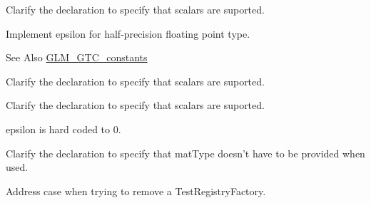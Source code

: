 
\begin{DoxyRefList}
\item[\label{todo__todo000002}%
\hypertarget{todo__todo000002}{}%
Member \hyperlink{group__core__func__integer_gaf5ecf64cbcb7f806a3c7915dd622209b}{glm\-:\-:bit\-Count} (gen\-I\-U\-Type$<$ T $>$ const \&Value)]Clarify the declaration to specify that scalars are suported.  
\item[\label{todo__todo000008}%
\hypertarget{todo__todo000008}{}%
Member \hyperlink{group__gtc__constants_gacb41049b8d22c8aa90e362b96c524feb}{glm\-:\-:epsilon} ()]Implement epsilon for half-\/precision floating point type. \begin{DoxySeeAlso}{See Also}
\hyperlink{group__gtc__constants}{G\-L\-M\-\_\-\-G\-T\-C\-\_\-constants}  
\end{DoxySeeAlso}

\item[\label{todo__todo000003}%
\hypertarget{todo__todo000003}{}%
Member \hyperlink{group__core__func__integer_ga43d5d9ec05ba4c46035c764ad5fd3135}{glm\-:\-:find\-L\-S\-B} (gen\-I\-U\-Type$<$ T $>$ const \&Value)]Clarify the declaration to specify that scalars are suported.  
\item[\label{todo__todo000004}%
\hypertarget{todo__todo000004}{}%
Member \hyperlink{group__core__func__integer_gaee931af2eaecf61b629b33899c9d6f29}{glm\-:\-:find\-M\-S\-B} (gen\-I\-U\-Type$<$ T $>$ const \&Value)]Clarify the declaration to specify that scalars are suported.  
\item[\label{todo__todo000009}%
\hypertarget{todo__todo000009}{}%
Member \hyperlink{group__gtx__vector__angle_ga6f9cbae1b02b49ad92a1d0070649f038}{glm\-:\-:oriented\-Angle} (detail\-::tvec2$<$ T, P $>$ const \&x, detail\-::tvec2$<$ T, P $>$ const \&y)]epsilon is hard coded to 0.  
\item[\label{todo__todo000005}%
\hypertarget{todo__todo000005}{}%
Member \hyperlink{group__core__func__matrix_gae9f513dc8e4f3ceb993669321b6d0f09}{glm\-:\-:outer\-Product} (vec\-Type\-A$<$ T, P $>$ const \&c, vec\-Type\-B$<$ T, P $>$ const \&r)]Clarify the declaration to specify that mat\-Type doesn't have to be provided when used.  
\item[\label{todo__todo000001}%
\hypertarget{todo__todo000001}{}%
Member \hyperlink{class_test_factory_registry_afa3fb925b07eb34e9ccfab84812afc18}{Test\-Factory\-Registry\-:\-:unregister\-Factory} (\hyperlink{class_test_factory}{Test\-Factory} $\ast$factory)]Address case when trying to remove a Test\-Registry\-Factory. 
\end{DoxyRefList}